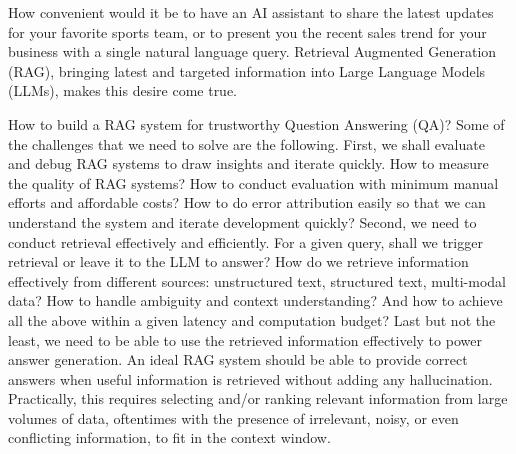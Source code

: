 \documentclass[11pt]{article}
\begin{document}
How convenient would it be to have an AI assistant to share the latest updates for your favorite sports team, or to present you the recent sales trend for your business with a single natural language query. Retrieval Augmented Generation (RAG), bringing latest and targeted information into Large Language Models (LLMs), makes this desire come true. 

How to build a RAG system for trustworthy Question Answering (QA)? Some of the challenges that we need to solve are the following. First, we shall evaluate and debug RAG systems to draw insights and iterate quickly. How to measure the quality of RAG systems? How to conduct evaluation with minimum manual efforts and affordable costs? How to do error attribution easily so that we can understand the system and iterate development quickly? Second, we need to conduct retrieval effectively and efficiently. For a given query, shall we trigger retrieval or leave it to the LLM to answer? How do we retrieve information effectively from different sources: unstructured text, structured text, multi-modal data? How to handle ambiguity and context understanding? And how to achieve all the above within a given latency and computation budget? Last but not the least, we need to be able to use the retrieved information effectively to power answer generation. An ideal RAG system should be able to provide correct answers when useful information is retrieved without adding any hallucination. Practically, this requires selecting and/or ranking relevant information from large volumes of data, oftentimes with the presence of irrelevant, noisy, or even conflicting information, to fit in the context window. 
\end{document}
